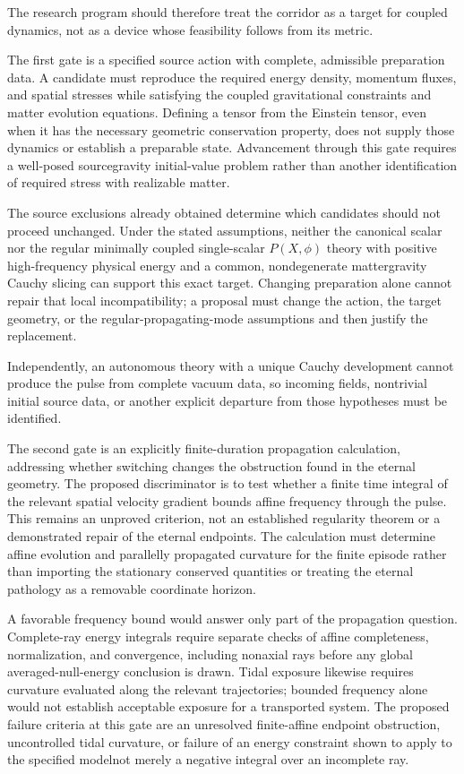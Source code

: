 \documentclass[11pt]{article}
\begin{document}
The research program should therefore treat the corridor as a target for coupled dynamics, not as a device whose feasibility follows from its metric.

The first gate is a specified source action with complete, admissible preparation data. A candidate must reproduce the required energy density, momentum fluxes, and spatial stresses while satisfying the coupled gravitational constraints and matter evolution equations. Defining a tensor from the Einstein tensor, even when it has the necessary geometric conservation property, does not supply those dynamics or establish a preparable state. Advancement through this gate requires a well-posed source\textendash{}gravity initial-value problem rather than another identification of required stress with realizable matter.

The source exclusions already obtained determine which candidates should not proceed unchanged. Under the stated assumptions, neither the canonical scalar nor the regular minimally coupled single-scalar $P(X,\phi)$ theory with positive high-frequency physical energy and a common, nondegenerate matter\textendash{}gravity Cauchy slicing can support this exact target. Changing preparation alone cannot repair that local incompatibility; a proposal must change the action, the target geometry, or the regular-propagating-mode assumptions and then justify the replacement.

Independently, an autonomous theory with a unique Cauchy development cannot produce the pulse from complete vacuum data, so incoming fields, nontrivial initial source data, or another explicit departure from those hypotheses must be identified.

The second gate is an explicitly finite-duration propagation calculation, addressing whether switching changes the obstruction found in the eternal geometry. The proposed discriminator is to test whether a finite time integral of the relevant spatial velocity gradient bounds affine frequency through the pulse. This remains an unproved criterion, not an established regularity theorem or a demonstrated repair of the eternal endpoints. The calculation must determine affine evolution and parallelly propagated curvature for the finite episode rather than importing the stationary conserved quantities or treating the eternal pathology as a removable coordinate horizon.

A favorable frequency bound would answer only part of the propagation question. Complete-ray energy integrals require separate checks of affine completeness, normalization, and convergence, including nonaxial rays before any global averaged-null-energy conclusion is drawn. Tidal exposure likewise requires curvature evaluated along the relevant trajectories; bounded frequency alone would not establish acceptable exposure for a transported system. The proposed failure criteria at this gate are an unresolved finite-affine endpoint obstruction, uncontrolled tidal curvature, or failure of an energy constraint shown to apply to the specified model\textemdash{}not merely a negative integral over an incomplete ray.
\end{document}
